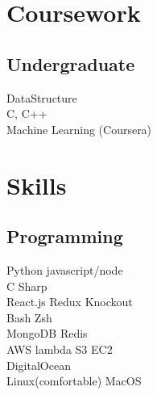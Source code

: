 \documentclass[]{deedy-resume-openfont}
\begin{document}
\begin{minipage}[t]{0.33\textwidth}

\section{Coursework}

\subsection{Undergraduate}
DataStructure \\
C, C++ \\
Machine Learning (Coursera) \\
\sectionsep


\section{Skills}
\subsection{Programming}
\textbullet{} Python \textbullet{} javascript/node \\
\textbullet{} C Sharp \\
\textbullet{} React.js \textbullet{} Redux \textbullet{} Knockout \\
\textbullet{} Bash \textbullet{} Zsh \\
\textbullet{} MongoDB \textbullet{} Redis \\
\textbullet{} AWS lambda \textbullet{} S3 \textbullet{} EC2 \\
\textbullet{} DigitalOcean \\
\textbullet{} Linux(comfortable) \textbullet{} MacOS \\
\sectionsep


\end{minipage}
\end{document}
